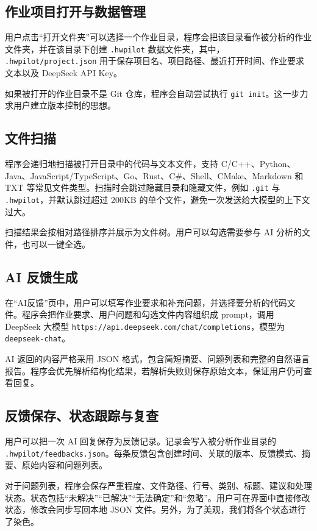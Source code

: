 \documentclass[UTF8,a4paper,11pt,fontset=fandol]{ctexart}
\begin{document}
\subsection{作业项目打开与数据管理}

用户点击“打开文件夹”可以选择一个作业目录，程序会把该目录看作被分析的作业文件夹，并在该目录下创建 \texttt{.hwpilot} 数据文件夹，其中， \texttt{.hwpilot/project.json} 用于保存项目名、项目路径、最近打开时间、作业要求文本以及 DeepSeek API Key。

如果被打开的作业目录不是 Git 仓库，程序会自动尝试执行 \texttt{git init}。这一步力求用户建立版本控制的思想。

\subsection{文件扫描}

程序会递归地扫描被打开目录中的代码与文本文件，支持 C/C++、Python、Java、JavaScript/TypeScript、Go、Rust、C\#、Shell、CMake、Markdown 和 TXT 等常见文件类型。扫描时会跳过隐藏目录和隐藏文件，例如 \texttt{.git} 与 \texttt{.hwpilot}，并默认跳过超过 200KB 的单个文件，避免一次发送给大模型的上下文过大。

扫描结果会按相对路径排序并展示为文件树。用户可以勾选需要参与 AI 分析的文件，也可以一键全选。

\subsection{AI 反馈生成}

在“AI反馈”页中，用户可以填写作业要求和补充问题，并选择要分析的代码文件。程序会把作业要求、用户问题和勾选文件内容组织成 prompt，调用 DeepSeek 大模型 \texttt{https://api.deepseek.com/chat/completions}，模型为 \texttt{deepseek-chat}。

AI 返回的内容严格采用 JSON 格式，包含简短摘要、问题列表和完整的自然语言报告。程序会优先解析结构化结果，若解析失败则保存原始文本，保证用户仍可查看回复。

\subsection{反馈保存、状态跟踪与复查}

用户可以把一次 AI 回复保存为反馈记录。记录会写入被分析作业目录的 \texttt{.hwpilot/feedbacks.json}。每条反馈包含创建时间、关联的版本、反馈模式、摘要、原始内容和问题列表。

对于问题列表，程序会保存严重程度、文件路径、行号、类别、标题、建议和处理状态。状态包括“未解决”“已解决”“无法确定”和“忽略”。用户可在界面中直接修改状态，修改会同步写回本地 JSON 文件。另外，为了美观，我们将各个状态进行了染色。
\end{document}
